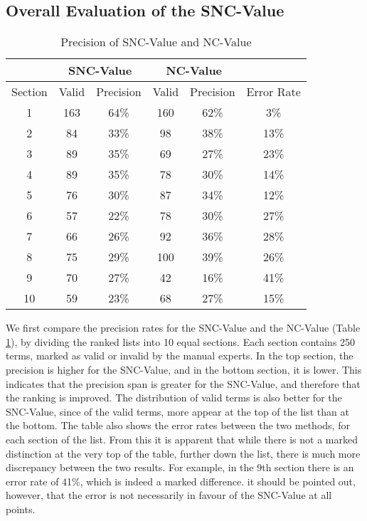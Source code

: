 \subsection{Overall Evaluation of the SNC-Value}

\begin{table}
\begin{center}
\begin{tabular}{|c|c|c|c|c|c|}
\hline
& \multicolumn{2}{c|}{SNC-Value} & \multicolumn{2}{c|}{NC-Value} &\\
\hline
Section & Valid & Precision & Valid & Precision & Error Rate\\
\hline
1 & 163 & 64\% & 160 & 62\% & 3\% \\
2 & 84 & 33\% & 98 & 38\% & 13\% \\
3 & 89 & 35\% & 69 & 27\% &  23\% \\
4 & 89 & 35\% & 78 & 30\% &  14\% \\
5 & 76 & 30\% & 87 & 34\% & 12\% \\
6 & 57 & 22\% & 78 & 30\% & 27\% \\
7 & 66 & 26\% & 92 & 36\% & 28\% \\
8 & 75 & 29\% & 100 & 39\% & 26\% \\
9 & 70 & 27\% & 42 & 16\% & 41\% \\
10 & 59 & 23\% & 68 & 27\% & 15\% \\
\hline
\end{tabular}
\end{center}
\caption{Precision of SNC-Value and NC-Value}
\label{table:precision-10}
\end{table}

We first compare the precision rates for the SNC-Value and the
NC-Value (Table \ref{table:precision-10}), by
dividing the ranked lists into 10 equal sections. Each section
contains 250 terms, marked as valid or invalid by the manual
experts. In the top section, the precision is higher for
the SNC-Value, and in the bottom section, it is lower. This indicates
that the precision span is greater for the SNC-Value, and therefore
that the ranking is improved. The distribution of valid terms is also
better for the SNC-Value, since of the valid terms, more appear at the top of
the list than at the bottom. The table also shows the error rates
between the two methods, for each section of the list. From this it is
apparent that while there is not a marked distinction at the very top
of the table, further down the list, there is much more discrepancy
between the two results. For example, in the 9th section there is an
error rate of 41\%, which is indeed a marked difference. it should be
pointed out, however, that the error is not necessarily in favour of
the SNC-Value at all points.
 
